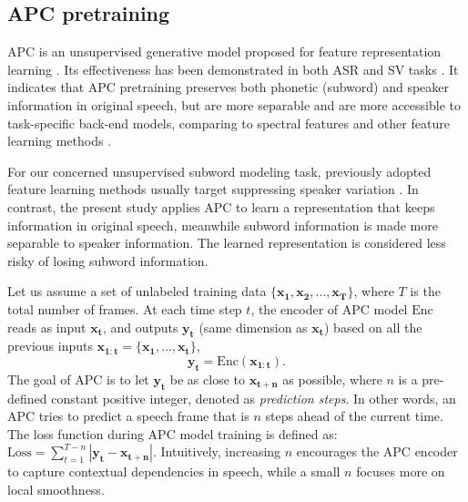 \documentclass[a4paper]{article}
\begin{document}
\subsection{APC pretraining}
APC is an unsupervised generative model proposed for feature representation learning \cite{Chung2019}. 
Its effectiveness has been demonstrated in both ASR and SV tasks \cite{Chung2019}. It indicates that APC pretraining preserves both phonetic (subword) and speaker information in original speech,  but are more  separable and are more accessible to task-specific back-end models, comparing to spectral features and other feature learning methods \cite{Chung2019}. 

For our concerned unsupervised subword modeling task, previously adopted feature learning methods 
usually target suppressing speaker variation \cite{Feng2019improving,heck2017feature}. In contrast, the present study applies APC to learn a representation that keeps information in original speech, meanwhile subword information is made more separable to speaker information. The learned representation is considered less risky of losing
subword information.



Let us assume a set of unlabeled training data $\{\bm{x_1}, \bm{x_2}, \ldots, \bm{x_T}\}$, where $T$ is the total number of frames. At each time step $t$, the encoder of APC model $\textrm{Enc}$ reads as input
$\bm{x_t}$, 
and outputs $\bm{y_t}$ (same dimension as $\bm{x_t}$) based on all the previous inputs $\bm{x_{1:t}}=\{\bm{x_1},\ldots,\bm{x_t}\}$,
\begin{equation}
    \bm{y_t} = \textrm{Enc} (\bm{x_{1:t}}).
    \label{eqt:enc}
\end{equation}
The goal of APC is to let $\bm{y_t}$ be as close to $\bm{x_{t+n}}$ as possible, where $n$ is a pre-defined constant positive integer, denoted as \textit{prediction steps}. In other words, an APC tries to predict a speech frame that is $n$ steps ahead of the current time. The loss function during APC model training is defined as: $\textrm{Loss} = \sum_{t=1}^{T-n} \left| \bm{y_t} - \bm{x_{t+n}} \right|$.
Intuitively, increasing $n$ encourages the APC encoder to capture contextual dependencies in speech, 
while a small $n$ focuses more on local smoothness.
 
\end{document}
